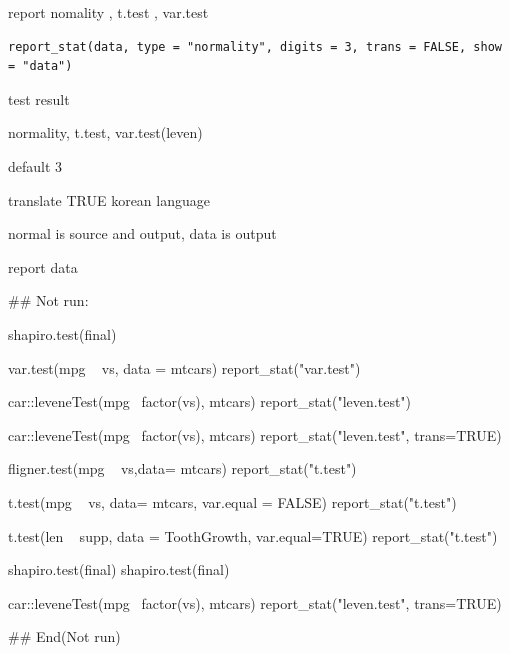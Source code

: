 \documentclass[a4paper]{book}
\begin{document}
%
\begin{Description}
report nomality , t.test , var.test
\end{Description}
%
\begin{Usage}
\begin{verbatim}
report_stat(data, type = "normality", digits = 3, trans = FALSE, show = "data")
\end{verbatim}
\end{Usage}
%
\begin{Arguments}
\begin{ldescription}
\item[\code{data}] test result

\item[\code{type}] normality, t.test, var.test(leven)

\item[\code{digits}] default 3

\item[\code{trans}] translate TRUE korean language

\item[\code{show}] normal is source and output, data is output
\end{ldescription}
\end{Arguments}
%
\begin{Value}
report data
\end{Value}
%
\begin{Examples}
\begin{ExampleCode}
## Not run: 

shapiro.test(final) %

var.test(mpg ~ vs, data = mtcars)%
report_stat("var.test")

car::leveneTest(mpg~ factor(vs), mtcars)%
 report_stat("leven.test")

car::leveneTest(mpg~ factor(vs), mtcars)%
report_stat("leven.test", trans=TRUE)


fligner.test(mpg ~ vs,data= mtcars) %
report_stat("t.test")

t.test(mpg ~ vs, data= mtcars, var.equal = FALSE)%
report_stat("t.test")

t.test(len ~ supp, data = ToothGrowth, var.equal=TRUE) %
report_stat("t.test")

shapiro.test(final) %
shapiro.test(final) %

car::leveneTest(mpg~ factor(vs), mtcars)%
report_stat("leven.test", trans=TRUE)



## End(Not run)

\end{ExampleCode}
\end{Examples}
\end{document}
